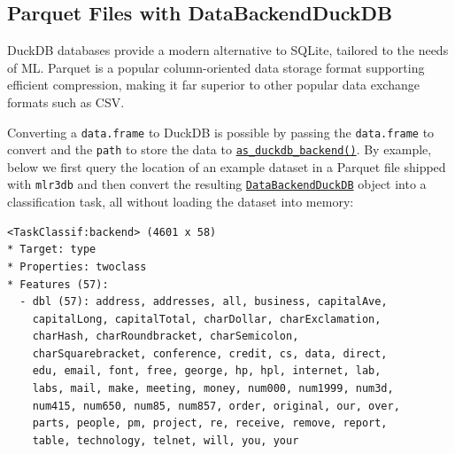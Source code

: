 \hypertarget{parquet-files-with-databackendduckdb}{%
\subsection{Parquet Files with
DataBackendDuckDB}\label{parquet-files-with-databackendduckdb}}

DuckDB databases provide a modern alternative to SQLite,
tailored to the needs of ML. Parquet is a popular
column-oriented data storage format supporting efficient compression,
making it far superior to other popular data exchange formats such as
CSV.

Converting a \texttt{data.frame} to DuckDB is possible by passing the
\texttt{data.frame} to convert and the \texttt{path} to store the data
to
\href{https://mlr3db.mlr-org.com/reference/as_duckdb_backend.html}{\texttt{as\_duckdb\_backend()}}.
By example, below we first query the location of an example dataset in a
Parquet file shipped with \texttt{mlr3db} and then convert the resulting
\href{https://mlr3db.mlr-org.com/reference/DataBackendDuckDB.html}{\texttt{DataBackendDuckDB}}
object into a classification task, all without loading the dataset into
memory:

\begin{Shaded}
\begin{Highlighting}[]
\OtherTok{=} \NormalTok{(}\NormalTok{(}\NormalTok{, }\NormalTok{),}
   \NormalTok{)}
\OtherTok{=} 
 \NormalTok{)}
\end{Highlighting}
\end{Shaded}

\begin{verbatim}
<TaskClassif:backend> (4601 x 58)
* Target: type
* Properties: twoclass
* Features (57):
  - dbl (57): address, addresses, all, business, capitalAve,
    capitalLong, capitalTotal, charDollar, charExclamation,
    charHash, charRoundbracket, charSemicolon,
    charSquarebracket, conference, credit, cs, data, direct,
    edu, email, font, free, george, hp, hpl, internet, lab,
    labs, mail, make, meeting, money, num000, num1999, num3d,
    num415, num650, num85, num857, order, original, our, over,
    parts, people, pm, project, re, receive, remove, report,
    table, technology, telnet, will, you, your
\end{verbatim}

